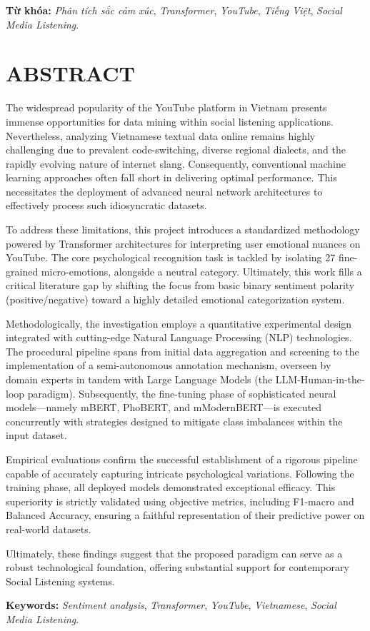\textbf{Từ khóa:} \textit{Phân tích sắc cảm xúc}, \textit{Transformer}, \textit{YouTube}, \textit{Tiếng Việt}, \textit{Social Media Listening}.

\chapter*{ABSTRACT}
\label{abstract}
The widespread popularity of the YouTube platform in Vietnam presents immense opportunities for data mining within social listening applications. Nevertheless, analyzing Vietnamese textual data online remains highly challenging due to prevalent code-switching, diverse regional dialects, and the rapidly evolving nature of internet slang. Consequently, conventional machine learning approaches often fall short in delivering optimal performance. This necessitates the deployment of advanced neural network architectures to effectively process such idiosyncratic datasets.

To address these limitations, this project introduces a standardized methodology powered by Transformer architectures for interpreting user emotional nuances on YouTube. The core psychological recognition task is tackled by isolating 27 fine-grained micro-emotions, alongside a neutral category. Ultimately, this work fills a critical literature gap by shifting the focus from basic binary sentiment polarity (positive/negative) toward a highly detailed emotional categorization system.

Methodologically, the investigation employs a quantitative experimental design integrated with cutting-edge Natural Language Processing (NLP) technologies. The procedural pipeline spans from initial data aggregation and screening to the implementation of a semi-autonomous annotation mechanism, overseen by domain experts in tandem with Large Language Models (the LLM-Human-in-the-loop paradigm). Subsequently, the fine-tuning phase of sophisticated neural models—namely mBERT, PhoBERT, and mModernBERT—is executed concurrently with strategies designed to mitigate class imbalances within the input dataset.

Empirical evaluations confirm the successful establishment of a rigorous pipeline capable of accurately capturing intricate psychological variations. Following the training phase, all deployed models demonstrated exceptional efficacy. This superiority is strictly validated using objective metrics, including F1-macro and Balanced Accuracy, ensuring a faithful representation of their predictive power on real-world datasets.

Ultimately, these findings suggest that the proposed paradigm can serve as a robust technological foundation, offering substantial support for contemporary Social Listening systems.

\textbf{Keywords:} \textit{Sentiment analysis}, \textit{Transformer}, \textit{YouTube}, \textit{Vietnamese}, \textit{Social Media Listening}.
